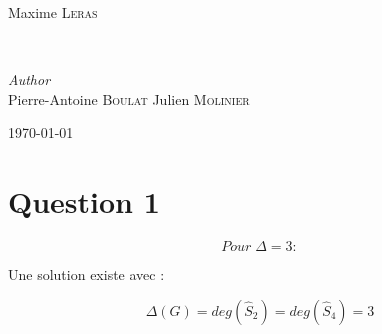 \documentclass[11pt]{article}
\begin{document}
\begin{titlepage}
\begin{minipage}{0.4\textwidth}
\begin{flushleft}
			Maxime \textsc{Leras} %
		\end{flushleft}
	\end{minipage}
	~
	\begin{minipage}{0.4\textwidth}
		\begin{flushright}
			\large
			\textit{Author}\\
			Pierre-Antoine \textsc{Boulat} %
			Julien \textsc{Molinier} %
		\end{flushright}
	\end{minipage}
	
	
	
	
	\vfill\vfill\vfill\vfill %
	
	{\large\today} %

	 
	
	\vfill %
	
\end{titlepage}


\newpage

\section{Question 1}
\paragraph{}
\begin{equation}
	Pour \; \Delta = 3 : 
\end{equation}

Une solution existe avec :

\begin{equation}
	\Delta(G) = deg({\widehat{S}_2}) = deg({\widehat{S}_4}) = 3
\end{equation}

\paragraph{}
\end{document}
